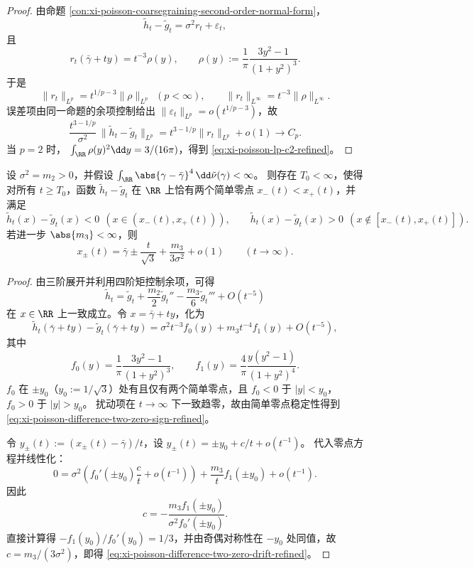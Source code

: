 \begin{proof}
由命题 \ref{con:xi-poisson-coarsegraining-second-order-normal-form}，
\[
\tilde h_t-\tilde g_t=\sigma^2 r_t+\varepsilon_t,
\]
且
\[
r_t(\bar\gamma+ty)=t^{-3}\rho(y),\qquad
\rho(y):=\frac{1}{\pi}\frac{3y^2-1}{(1+y^2)^3}.
\]
于是
\[
\|r_t\|_{L^p}=t^{1/p-3}\|\rho\|_{L^p}\ \ (p<\infty),\qquad
\|r_t\|_{L^\infty}=t^{-3}\|\rho\|_{L^\infty}.
\]
误差项由同一命题的余项控制给出
\(
\|\varepsilon_t\|_{L^p}=o(t^{1/p-3})
\)，故
\[
\frac{t^{3-1/p}}{\sigma^2}\,\|\tilde h_t-\tilde g_t\|_{L^p}
=t^{3-1/p}\|r_t\|_{L^p}+o(1)\to C_p.
\]
当 \(p=2\) 时，
\(
\int_{\RR}\rho(y)^2\dd y=3/(16\pi)
\)，得到 \eqref{eq:xi-poisson-lp-c2-refined}。
\end{proof}

\begin{theorem}[差分剖面的双零刚性与三阶矩偏心漂移]\label{thm:xi-poisson-difference-two-zero-rigidity-refined}
设 \(\sigma^2=m_2>0\)，并假设
\(
\int_{\RR}\abs{\gamma-\bar\gamma}^4\,\dd\tilde\nu(\gamma)<\infty
\)。
则存在 \(T_0<\infty\)，使得对所有 \(t\ge T_0\)，函数
\(\tilde h_t-\tilde g_t\) 在 \(\RR\) 上恰有两个简单零点
\(
x_-(t)<x_+(t)
\)，并满足
\begin{equation}\label{eq:xi-poisson-difference-two-zero-sign-refined}
\tilde h_t(x)-\tilde g_t(x)<0\ \ (x\in(x_-(t),x_+(t))),\qquad
\tilde h_t(x)-\tilde g_t(x)>0\ \ (x\notin[x_-(t),x_+(t)]).
\end{equation}
若进一步 \(\abs{m_3}<\infty\)，则
\begin{equation}\label{eq:xi-poisson-difference-two-zero-drift-refined}
x_\pm(t)=\bar\gamma\pm\frac{t}{\sqrt3}+\frac{m_3}{3\sigma^2}+o(1)\qquad(t\to\infty).
\end{equation}
\end{theorem}

\begin{proof}
由三阶展开并利用四阶矩控制余项，可得
\[
\tilde h_t=\tilde g_t+\frac{m_2}{2}\tilde g_t''-\frac{m_3}{6}\tilde g_t'''+O(t^{-5})
\]
在 \(x\in\RR\) 上一致成立。令 \(x=\bar\gamma+ty\)，化为
\[
\tilde h_t(\bar\gamma+ty)-\tilde g_t(\bar\gamma+ty)
=\sigma^2t^{-3}f_0(y)+m_3t^{-4}f_1(y)+O(t^{-5}),
\]
其中
\[
f_0(y)=\frac{1}{\pi}\frac{3y^2-1}{(1+y^2)^3},\qquad
f_1(y)=\frac{4}{\pi}\frac{y(y^2-1)}{(1+y^2)^4}.
\]
\(f_0\) 在 \(\pm y_0\)（\(y_0:=1/\sqrt3\)）处有且仅有两个简单零点，且
\(
f_0<0\) 于 \(|y|<y_0\)，\(f_0>0\) 于 \(|y|>y_0\)。
扰动项在 \(t\to\infty\) 下一致趋零，故由简单零点稳定性得到 \eqref{eq:xi-poisson-difference-two-zero-sign-refined}。

令 \(y_\pm(t):=(x_\pm(t)-\bar\gamma)/t\)，设
\(
y_\pm(t)=\pm y_0+c/t+o(t^{-1})
\)。
代入零点方程并线性化：
\[
0=\sigma^2\!\left(f_0'(\pm y_0)\frac{c}{t}+o(t^{-1})\right)
+\frac{m_3}{t}f_1(\pm y_0)+o(t^{-1}).
\]
因此
\[
c=-\frac{m_3f_1(\pm y_0)}{\sigma^2f_0'(\pm y_0)}.
\]
直接计算得 \(-f_1(y_0)/f_0'(y_0)=1/3\)，并由奇偶对称性在 \(-y_0\) 处同值，故 \(c=m_3/(3\sigma^2)\)，即得 \eqref{eq:xi-poisson-difference-two-zero-drift-refined}。
\end{proof}

